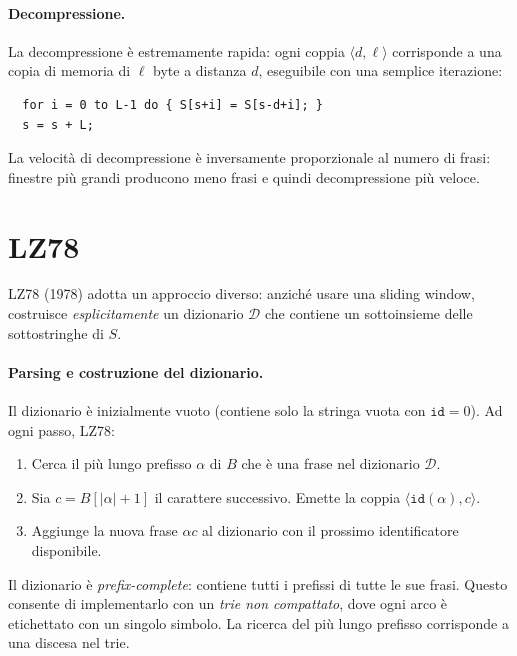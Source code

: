 \documentclass[12pt, a4paper, oneside]{book}
\theoremstyle{plain}
\theoremstyle{definition}
\theoremstyle{remark}
\begin{document}
\paragraph{Decompressione.}
La decompressione è estremamente rapida: ogni coppia $\langle d, \ell \rangle$ corrisponde a una copia di memoria di $\ell$ byte a distanza $d$, eseguibile con una semplice iterazione:
\begin{verbatim}
  for i = 0 to L-1 do { S[s+i] = S[s-d+i]; }
  s = s + L;
\end{verbatim}
La velocità di decompressione è inversamente proporzionale al numero di frasi: finestre più grandi producono meno frasi e quindi decompressione più veloce.

\section{LZ78}
\label{sec:lz78}

LZ78 (1978) adotta un approccio diverso: anziché usare una sliding window, costruisce \emph{esplicitamente} un dizionario $\mathcal{D}$ che contiene un sottoinsieme delle sottostringhe di $S$.

\paragraph{Parsing e costruzione del dizionario.}
Il dizionario è inizialmente vuoto (contiene solo la stringa vuota con $\mathtt{id} = 0$). Ad ogni passo, LZ78:
\begin{enumerate}
  \item Cerca il più lungo prefisso $\alpha$ di $B$ che è una frase nel dizionario $\mathcal{D}$.
  \item Sia $c = B[|\alpha| + 1]$ il carattere successivo. Emette la coppia $\langle \mathtt{id}(\alpha), c \rangle$.
  \item Aggiunge la nuova frase $\alpha c$ al dizionario con il prossimo identificatore disponibile.
\end{enumerate}

Il dizionario è \emph{prefix-complete}: contiene tutti i prefissi di tutte le sue frasi. Questo consente di implementarlo con un \emph{trie non compattato}, dove ogni arco è etichettato con un singolo simbolo. La ricerca del più lungo prefisso corrisponde a una discesa nel trie.
\end{document}
